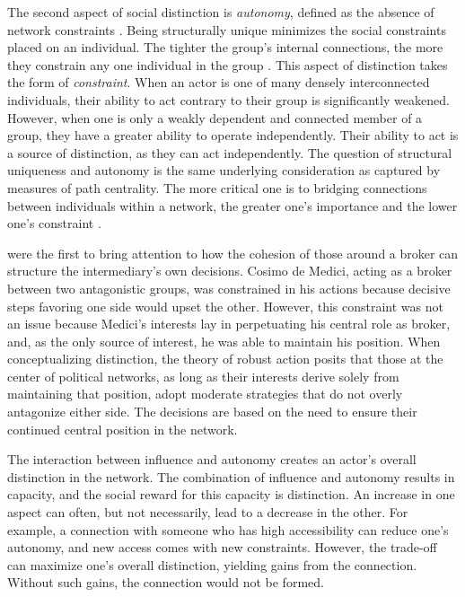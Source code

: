 \documentclass[12pt]{article}
\begin{document}
The second aspect of social distinction is \textit{autonomy}, defined as the absence of network constraints \citep{burt1980autonomy}. Being structurally unique minimizes the social constraints placed on an individual. The tighter the group's internal connections, the more they constrain any one individual in the group \citep{burt1995structural-5e8}. This aspect of distinction takes the form of \textit{constraint}. When an actor is one of many densely interconnected individuals, their ability to act contrary to their group is significantly weakened. However, when one is only a weakly dependent and connected member of a group, they have a greater ability to operate independently. Their ability to act is a source of distinction, as they can act independently. The question of structural uniqueness and autonomy is the same underlying consideration as captured by measures of path centrality. The more critical one is to bridging connections between individuals within a network, the greater one's importance and the lower one's constraint \citep{burt1995structural-5e8}. 

\citet[1263-4]{padgett1993robust} were the first to bring attention to how the cohesion of those around a broker can structure the intermediary's own decisions. Cosimo de Medici, acting as a broker between two antagonistic groups, was constrained in his actions because decisive steps favoring one side would upset the other. However, this constraint was not an issue because Medici’s interests lay in perpetuating his central role as broker, and, as the only source of interest, he was able to maintain his position. When conceptualizing distinction, the theory of robust action posits that those at the center of political networks, as long as their interests derive solely from maintaining that position, adopt moderate strategies that do not overly antagonize either side. The decisions are based on the need to ensure their continued central position in the network. 

The interaction between influence and autonomy creates an actor’s overall distinction in the network. The combination of influence and autonomy results in capacity, and the social reward for this capacity is distinction. An increase in one aspect can often, but not necessarily, lead to a decrease in the other. For example, a connection with someone who has high accessibility can reduce one’s autonomy, and new access comes with new constraints. However, the trade-off can maximize one’s overall distinction, yielding gains from the connection. Without such gains, the connection would not be formed.
\end{document}
